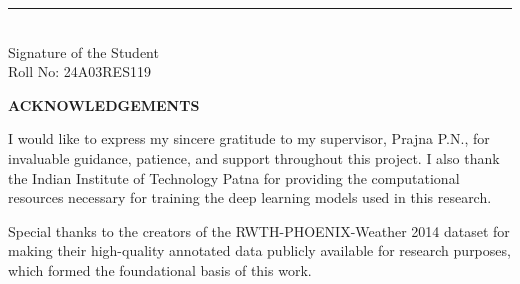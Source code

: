 \vspace{3cm}

\noindent \rule{5cm}{0.4pt}\\
Signature of the Student\\
Roll No: 24A03RES119

\clearpage

\begin{center}
{\Large \bfseries ACKNOWLEDGEMENTS}\\[1cm]
\end{center}

I would like to express my sincere gratitude to my supervisor, Prajna P.N., for invaluable guidance, patience, and support throughout this project. I also thank the Indian Institute of Technology Patna for providing the computational resources necessary for training the deep learning models used in this research.

Special thanks to the creators of the RWTH-PHOENIX-Weather 2014 dataset for making their high-quality annotated data publicly available for research purposes, which formed the foundational basis of this work.

\clearpage

\tableofcontents
\clearpage

\listoftables
\clearpage

\listoffigures
\clearpage

